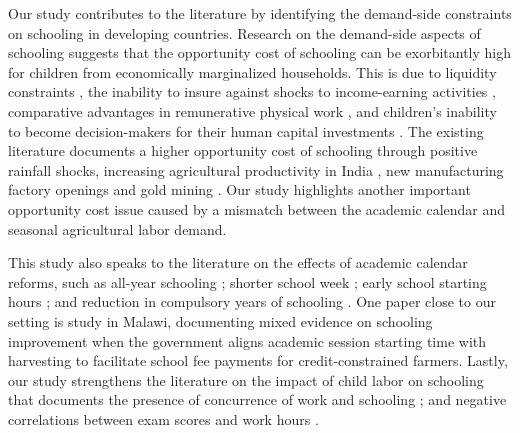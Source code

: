 \documentclass[12pt,letterpaper]{article}
\newcommand{\0}{\ensuremath{\mbox{\boldmath $0$}}}
\begin{document}
Our study contributes to the literature by identifying the demand-side constraints on schooling in developing countries. Research on the demand-side aspects of schooling suggests that the opportunity cost of schooling can be exorbitantly high for children from economically marginalized households. This is due to liquidity constraints  \citep{JacobySkoufias1997, BeegleDehejiaGatti2006}, the inability to insure against shocks to income-earning activities \citep{Jensen2000, deJanvryetal2006, Case2006}, comparative advantages in remunerative physical work \citep{PittRosenzweigHassan2010}, and children’s inability to become decision-makers for their human capital investments  \citep{BalandRobinson2000}. The existing literature documents a higher opportunity cost of schooling through positive rainfall shocks, increasing agricultural productivity in India \citep{shah2017drought}, new manufacturing factory openings \citep{atkin2016endogenous} and gold mining \citep{santos2018blessing}. Our study highlights another important opportunity cost issue caused by a mismatch between the academic calendar and seasonal agricultural labor demand.

This study also speaks to the literature on the effects of academic calendar reforms, such as all-year schooling \citep{ mcmullen2012impact, graves2010academic}; shorter school week \citep{anderson2015does}; early school starting hours \citep{cortes2012role,  hinrichs2011bell, edwards2012early, carrell2011s}; and reduction in compulsory years of schooling \citep{elsayed2021less}. One paper close to our setting is \cite{dillon2021selling} study in Malawi, documenting mixed evidence on schooling improvement when the government aligns academic session starting time with harvesting to facilitate school fee payments for credit-constrained farmers. Lastly, our study strengthens the literature on the impact of child labor on schooling that documents the presence of concurrence of work and schooling \citep{RavallionWodon2000, Edmonds2007, Dumas2012}; and negative correlations between exam scores and work hours \citep{AkabayashiPsacharopoulos1999, Heady2003, Gunnarsson2006}.

\end{document}
